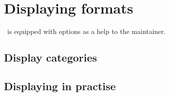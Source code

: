 
\chapter{Displaying formats}

\mf\ is equipped with  options as a help to the maintainer.


\section{Display categories}

\section{Displaying in practise}

%
%
%
%

